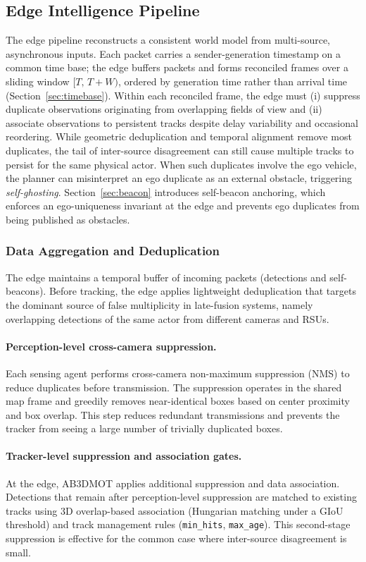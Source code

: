 \subsection{Edge Intelligence Pipeline}
The edge pipeline reconstructs a consistent world model from multi-source, asynchronous inputs. Each packet carries a sender-generation timestamp on a common time base; the edge buffers packets and forms reconciled frames over a sliding window \([T,\,T{+}W)\), ordered by generation time rather than arrival time (Section~\ref{sec:timebase}). Within each reconciled frame, the edge must (i) suppress duplicate observations originating from overlapping fields of view and (ii) associate observations to persistent tracks despite delay variability and occasional reordering. While geometric deduplication and temporal alignment remove most duplicates, the tail of inter-source disagreement can still cause multiple tracks to persist for the same physical actor. When such duplicates involve the ego vehicle, the planner can misinterpret an ego duplicate as an external obstacle, triggering \emph{self-ghosting}. Section~\ref{sec:beacon} introduces self-beacon anchoring, which enforces an ego-uniqueness invariant at the edge and prevents ego duplicates from being published as obstacles.


\subsubsection{Data Aggregation and Deduplication}
The edge maintains a temporal buffer of incoming packets (detections and self-beacons). Before tracking, the edge applies lightweight deduplication that targets the dominant source of false multiplicity in late-fusion systems, namely overlapping detections of the same actor from different cameras and RSUs.

\paragraph{Perception-level cross-camera suppression.}
Each sensing agent performs cross-camera non-maximum suppression (NMS) to reduce duplicates before transmission. The suppression operates in the shared map frame and greedily removes near-identical boxes based on center proximity and box overlap. This step reduces redundant transmissions and prevents the tracker from seeing a large number of trivially duplicated boxes.

\paragraph{Tracker-level suppression and association gates.}
At the edge, AB3DMOT applies additional suppression and data association. Detections that remain after perception-level suppression are matched to existing tracks using 3D overlap-based association (Hungarian matching under a GIoU threshold) and track management rules (\texttt{min\_hits}, \texttt{max\_age}). This second-stage suppression is effective for the common case where inter-source disagreement is small.

